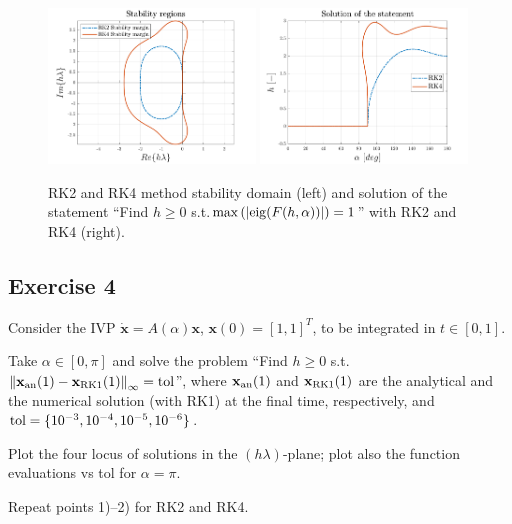 \documentclass[11pt,a4paper,oneside]{article}
\renewcommand{\vec}[1]{\mathbf{#1}}
\begin{document}
\begin{figure}[h]
    \centering
    \includegraphics[width=0.49\textwidth]{gfx/ex3_2.pdf}
    \includegraphics[width=0.49\textwidth]{gfx/ex3_1.pdf}
    \caption{RK2 and RK4 method stability domain (left) and solution of the statement ``Find $h\ge 0$ s.t.$\max\left(|{\rm eig}(F(h,\alpha))|\right) = 1$'' with RK2 and RK4 (right).}
    \label{fig:ex3_stab}
\end{figure}

\subsection*{Exercise 4}

Consider the IVP $\dot{\vec x}=A(\alpha)\vec x$, $\vec x(0) = [1, 1]^T$, to be integrated in $t\in[0, 1]$.
\begin{enumerate*}[label=\arabic*)]
    \item Take $\alpha\in[0, \pi]$ and solve the problem ``Find $h\ge 0$ s.t. $\left\|\vec x_{\rm an}(1)-\vec x_{\rm RK1}(1)\right\|_\infty = \mathrm{tol}$'', where $\vec x_{\rm an}(1)$ and $\vec x_{\rm RK1}(1)$ are the analytical and the numerical solution (with RK1) at the final time, respectively, and $\rm tol = \{10^{-3}, 10^{-4}, 10^{-5}, 10^{-6}\}$.
    \item Plot the four locus of solutions in the $(h\lambda)$-plane; plot also the function evaluations vs tol for $\alpha= \pi$.
    \item Repeat points 1)--2) for RK2 and RK4.
\end{enumerate*}
\end{document}
